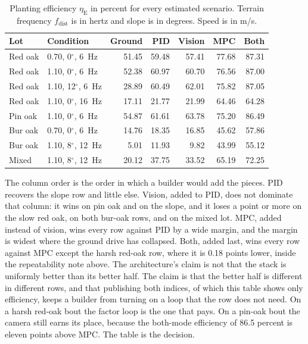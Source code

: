 \begin{table}[htbp]
\centering
\caption{Planting efficiency $\eta_{\mathrm{E}}$ in percent for every estimated scenario. Terrain frequency $f_{\mathrm{dist}}$ is in hertz and slope is in degrees. Speed is in m/s.}
\label{tab:all}
\begin{tabular}{@{}llrrrrr@{}}
\toprule
Lot & Condition & Ground & PID & Vision & MPC & Both \\
\midrule
Red oak & 0.70, 0$^\circ$, 6~Hz & 51.45 & 59.48 & 57.41 & 77.68 & 87.31 \\
Red oak & 1.10, 0$^\circ$, 6~Hz & 52.38 & 60.97 & 60.70 & 76.56 & 87.00 \\
Red oak & 1.10, 12$^\circ$, 6~Hz & 28.89 & 60.49 & 62.01 & 75.82 & 87.05 \\
Red oak & 1.10, 0$^\circ$, 16~Hz & 17.11 & 21.77 & 21.99 & 64.46 & 64.28 \\
Pin oak & 1.10, 0$^\circ$, 6~Hz & 54.87 & 61.61 & 63.78 & 75.20 & 86.49 \\
Bur oak & 0.70, 0$^\circ$, 6~Hz & 14.76 & 18.35 & 16.85 & 45.62 & 57.86 \\
Bur oak & 1.10, 8$^\circ$, 12~Hz & 5.01 & 11.93 & 9.82 & 43.99 & 55.12 \\
Mixed & 1.10, 8$^\circ$, 12~Hz & 20.12 & 37.75 & 33.52 & 65.19 & 72.25 \\
\bottomrule
\end{tabular}
\end{table}

The column order is the order in which a builder would add the pieces. PID recovers the slope row and little else. Vision, added to PID, does not dominate that column: it wins on pin oak and on the slope, and it loses a point or more on the slow red oak, on both bur-oak rows, and on the mixed lot. MPC, added instead of vision, wins every row against PID by a wide margin, and the margin is widest where the ground drive has collapsed. Both, added last, wins every row against MPC except the harsh red-oak row, where it is 0.18 points lower, inside the repeatability note above. The architecture's claim is not that the stack is uniformly better than its better half. The claim is that the better half is different in different rows, and that publishing both indices, of which this table shows only efficiency, keeps a builder from turning on a loop that the row does not need. On a harsh red-oak bout the factor loop is the one that pays. On a pin-oak bout the camera still earns its place, because the both-mode efficiency of 86.5 percent is eleven points above MPC. The table is the decision.

